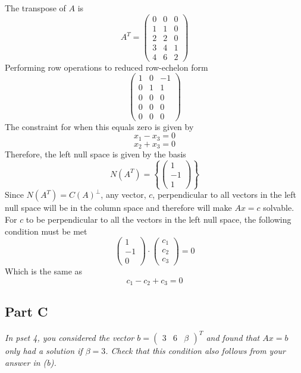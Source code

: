 \documentclass{article}
\begin{document}
\bigbreak

The transpose of $ A $ is
$$ A^T = \begin{pmatrix}
    0 & 0 & 0 \\
    1 & 1 & 0 \\
    2 & 2 & 0 \\
    3 & 4 & 1 \\
    4 & 6 & 2
\end{pmatrix} $$
Performing row operations to reduced row-echelon form
$$ \begin{pmatrix}
    1 & 0 & -1 \\
    0 & 1 & 1 \\
    0 & 0 & 0 \\
    0 & 0 & 0 \\
    0 & 0 & 0
\end{pmatrix} $$
The constraint for when this equals zero is given by
$$ x_1 - x_3 = 0 $$
$$ x_2 + x_3 = 0 $$
Therefore, the left null space is given by the basis
$$ N(A^T) = \left\{ \begin{pmatrix}
    1 \\
    -1 \\
    1
\end{pmatrix} \right\} $$
Since $ N(A^T) = C(A)^\perp $, any vector, $c$, perpendicular to all vectors
in the left null space will be in the column space and therefore will make $
Ax = c $ solvable. For $c$ to be perpendicular to all the vectors in the left
null space, the following condition must be met
$$ \begin{pmatrix}
    1 \\
    -1 \\
    0
\end{pmatrix} \cdot \begin{pmatrix}
    c_1 \\
    c_2 \\
    c_3
\end{pmatrix} = 0 $$
Which is the same as 
$$ c_1 - c_2 + c_3 = 0 $$

\subsection*{Part C}

\textit{In pset 4, you considered the vector $b = \begin{pmatrix} 3 & 6 & 
\beta \end{pmatrix}^T$ and found that $Ax=b$ only had a solution if $\beta =
3$. Check that this condition also follows from your answer in (b).}
\end{document}
